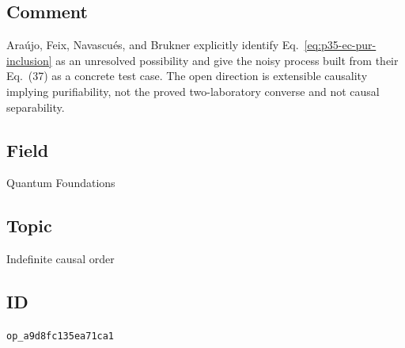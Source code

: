 \subsection*{Comment}

Ara\'ujo, Feix, Navascu\'es, and Brukner explicitly identify
Eq.~\eqref{eq:p35-ec-pur-inclusion} as an unresolved possibility and give the
noisy process built from their Eq.~(37) as a concrete test case.  The open
direction is extensible causality implying purifiability, not the proved
two-laboratory converse and not causal separability.

\subsection*{Field}

Quantum Foundations

\subsection*{Topic}

Indefinite causal order

\subsection*{ID}

\texttt{op\_a9d8fc135ea71ca1}
